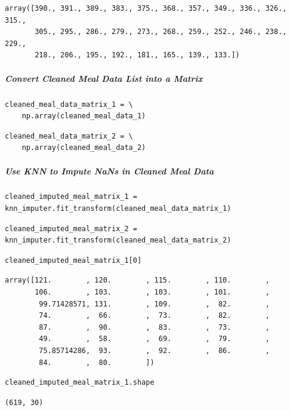 \begin{verbatim}
array([390., 391., 389., 383., 375., 368., 357., 349., 336., 326., 315.,
       305., 295., 286., 279., 273., 268., 259., 252., 246., 238., 229.,
       218., 206., 195., 192., 181., 165., 139., 133.])
\end{verbatim}

\subparagraph{Convert Cleaned Meal Data List into a Matrix}

\begin{verbatim}
cleaned_meal_data_matrix_1 = \
    np.array(cleaned_meal_data_1)
\end{verbatim}

\begin{verbatim}
cleaned_meal_data_matrix_2 = \
    np.array(cleaned_meal_data_2)
\end{verbatim}

\subparagraph{Use KNN to Impute NaNs in Cleaned Meal Data}

\begin{verbatim}
cleaned_imputed_meal_matrix_1 = knn_imputer.fit_transform(cleaned_meal_data_matrix_1)
\end{verbatim}

\begin{verbatim}
cleaned_imputed_meal_matrix_2 = knn_imputer.fit_transform(cleaned_meal_data_matrix_2)
\end{verbatim}

\begin{verbatim}
cleaned_imputed_meal_matrix_1[0]
\end{verbatim}

\begin{verbatim}
array([121.        , 120.        , 115.        , 110.        ,
       106.        , 103.        , 103.        , 101.        ,
        99.71428571, 131.        , 109.        ,  82.        ,
        74.        ,  66.        ,  73.        ,  82.        ,
        87.        ,  90.        ,  83.        ,  73.        ,
        49.        ,  58.        ,  69.        ,  79.        ,
        75.85714286,  93.        ,  92.        ,  86.        ,
        84.        ,  80.        ])
\end{verbatim}

\begin{verbatim}
cleaned_imputed_meal_matrix_1.shape
\end{verbatim}

\begin{verbatim}
(619, 30)
\end{verbatim}

